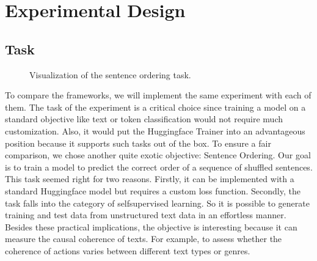 \documentclass[letterpaper,10pt,english]{jupyterBook}
\begin{document}
\chapter{Experimental Design}
\label{\detokenize{Experiment:experimental-design}}\label{\detokenize{Experiment::doc}}

\section{Task}
\label{\detokenize{Experiment:task}}
\begin{figure}[htbp]
\centering
\capstart

\noindent{}
\caption{Visualization of the sentence ordering task.}\label{\detokenize{Experiment:fig-task-desc}}\end{figure}

\sphinxAtStartPar
To compare the frameworks, we will implement the same experiment with each of them.
The task of the experiment is a critical choice since training a model on a standard objective like text\sphinxhyphen{} or token classification would not require much customization. Also, it would put the Huggingface Trainer into an advantageous position because it supports such tasks out of the box.
To ensure a fair comparison, we chose another quite exotic objective: Sentence Ordering.
Our goal is to train a model to predict the correct order of a sequence of shuffled sentences.
This task seemed right for two reasons.
Firstly, it can be implemented with a standard Huggingface model but requires a custom loss function.
Secondly, the task falls into the category of self\sphinxhyphen{}supervised learning. So it is possible to generate training and test data from unstructured text data in an effortless manner.
Besides these practical implications, the objective is interesting because it can measure the causal coherence of texts. For example, to assess whether the coherence of actions varies between different text types or genres.
\end{document}
